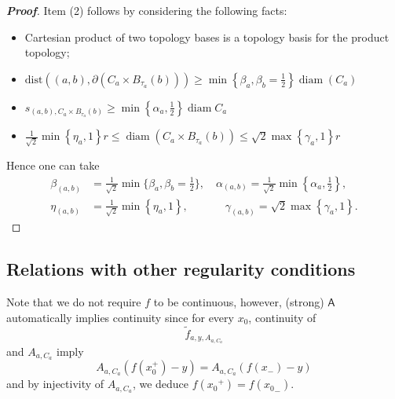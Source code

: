 \documentclass[a4, 12pt,leqno]{amsart}
\theoremstyle{plain}
\theoremstyle{definition}
\theoremstyle{remark}
\numberwithin{equation}{section}
\DeclareMathOperator{\diam}{diam}		%
\begin{document}
\begin{proof}[\footnotesize \textbf{Proof}]
\par Item (2) follows by considering the following facts: 
\begin{itemize}
	\item Cartesian product of two topology bases is a topology basis for the product topology;
	\item $\displaystyle \mathrm{dist}\left((a,b), \partial\left(C_{a}\times B_{\tau_a}(b)\right)\right) \ge \min\left\{\beta_{a}, \beta_b = \frac{1}{2}\right\}\diam(C_a)$
	\item $\displaystyle s_{(a,b), C_{a}\times B_{\tau_a}(b)} \ge \min\left\{\alpha_{a}, \frac{1}{2} \right\} \diam{C_a}$
\item $\displaystyle \frac{1}{\sqrt{2}} \min\left\{\eta_a, 1\right\}r\le \diam\left( C_a \times B_{\tau_a}(b)  \right) \le \sqrt{2}\max\left\{\gamma_a, 1\right\}r$
\end{itemize}   
Hence one can take
\begin{align*}
\beta_{(a,b)} &= \frac{1}{\sqrt{2}}\min\{\beta_{a}, \beta_b = \frac{1}{2}\}, \quad \alpha_{(a,b)} = \frac{1}{\sqrt{2}} \min\left\{\alpha_{a}, \frac{1}{2} \right\},\\
 \eta_{(a,b)} &= \frac{1}{\sqrt{2}} \min\left\{\eta_a, 1\right\}, \quad\quad\quad \;\hspace{1pt}\gamma_{(a,b)} = \sqrt{2}\max\left\{\gamma_a, 1\right\}.
\end{align*}
\end{proof}

\subsection*{Relations with other regularity conditions}
Note that we do not require $f$ to be continuous, however, (strong) $\textsf{A}$ automatically implies continuity since for every $x_0$, continuity of 
\[
\tilde{f}_{a,y,A_{a,C_a}}
\] 
and $A_{a,C_a}$ imply
\[
A_{a,C_a}(f(x_0^+) - y) = A_{a,C_a} (f(x_-) - y)
\]
and by injectivity of $A_{a,C_a}$, we deduce $f({x_0}^+) = f({x_0}_-)$. 
\end{document}
